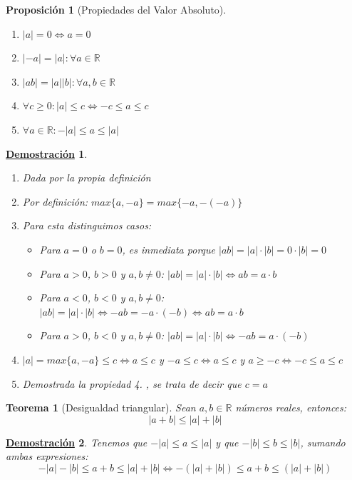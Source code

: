 \documentclass[10pt,a4paper,openright]{book}
\theoremstyle{break}
\newtheorem{theo}{Teorema}[chapter]
\newtheorem{prop}{Proposición}[chapter]
\newtheorem*{demo}{\underline{Demostración}}
\begin{document}
\begin{prop}[Propiedades del Valor Absoluto]
\begin{enumerate}
\item $|a|=0\Leftrightarrow a=0$
\item $|-a|=|a|: \forall a \in \mathbb R$
\item $|ab|=|a||b|: \forall a,b\in \mathbb R$
\item $\forall c\geq 0: |a|\leq c \Leftrightarrow -c\leq a\leq c$
\item $\forall a \in \mathbb R: -|a|\leq a\leq |a|$
\end{enumerate}
\end{prop}
\begin{demo}
\begin{enumerate}
\item Dada por la propia definición
\item Por definición: $max\{a,-a\}=max\{-a,-(-a)\}$
\item Para esta distinguimos casos:
	\begin{itemize}
	\item Para $a=0$ o $b=0$, es inmediata porque $|ab|=|a|\cdot |b|=0\cdot |b|=0$
	\item Para $a>0$, $b>0$ y $a,b\neq 0$: $|ab|=|a|\cdot |b|\Leftrightarrow ab=a\cdot b$
	\item Para $a<0$, $b<0$ y $a,b\neq 0$:$|ab|=|a|\cdot |b|\Leftrightarrow -ab=-a\cdot (-b)\Leftrightarrow ab=a\cdot b$
	\item Para $a>0$, $b<0$ y $a,b\neq 0$: $|ab|=|a|\cdot |b|\Leftrightarrow -ab=a\cdot(-b)$
	\end{itemize}

\item $|a|=max\{a,-a\}\leq c\Leftrightarrow a\leq c$ y $-a\leq c\Leftrightarrow a\leq c$ y $a\geq -c\Leftrightarrow -c\leq a\leq c$
\item Demostrada la propiedad 4. , se trata de decir que $c=a$
\end{enumerate}
\end{demo}

\begin{theo}[Desigualdad triangular]
Sean $a,b\in \mathbb R$ números reales, entonces:
$$|a+b|\leq|a|+|b|$$
\end{theo}
\begin{demo}
Tenemos que $-|a|\leq a\leq |a|$ y que $-|b|\leq b\leq |b|$, sumando ambas expresiones:
$$-|a|-|b|\leq a+b\leq |a|+|b|\Leftrightarrow -(|a|+|b|)\leq a+b\leq (|a|+|b|)$$
\end{demo}
\end{document}
